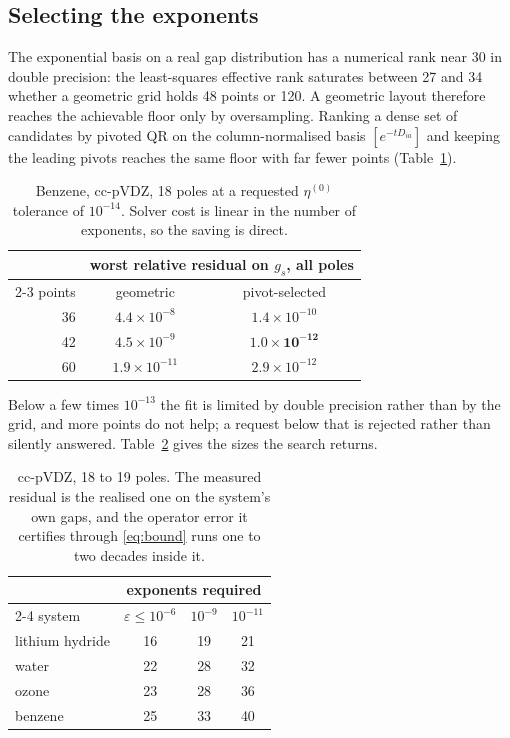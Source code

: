 \documentclass[11pt]{article}
\begin{document}
\subsection{Selecting the exponents}

The exponential basis on a real gap distribution has a numerical rank near 30 in double
precision: the least-squares effective rank saturates between 27 and 34 whether a geometric
grid holds 48 points or 120. A geometric layout therefore reaches the achievable floor only
by oversampling. Ranking a dense set of candidates by pivoted QR on the column-normalised
basis $[e^{-t D_{ia}}]$ and keeping the leading pivots reaches the same floor with far
fewer points (Table~\ref{tab:grid}).

\begin{table}[h]
\centering
\begin{tabular}{rcc}
\toprule
& \multicolumn{2}{c}{worst relative residual on $g_s$, all poles} \\
\cmidrule(l){2-3}
points & geometric & pivot-selected \\
\midrule
36 & $4.4\times10^{-8}$ & $1.4\times10^{-10}$ \\
42 & $4.5\times10^{-9}$ & $\bm{1.0\times10^{-12}}$ \\
60 & $1.9\times10^{-11}$ & $2.9\times10^{-12}$ \\
\bottomrule
\end{tabular}
\caption{Benzene, cc-pVDZ, 18 poles at a requested $\eta^{(0)}$ tolerance of $10^{-14}$.
Solver cost is linear in the number of exponents, so the saving is direct.}
\label{tab:grid}
\end{table}

Below a few times $10^{-13}$ the fit is limited by double precision rather than by the
grid, and more points do not help; a request below that is rejected rather than silently
answered. Table~\ref{tab:sizes} gives the sizes the search returns.

\begin{table}[h]
\centering
\begin{tabular}{lccc}
\toprule
& \multicolumn{3}{c}{exponents required} \\
\cmidrule(l){2-4}
system & $\varepsilon \le 10^{-6}$ & $10^{-9}$ & $10^{-11}$ \\
\midrule
lithium hydride & 16 & 19 & 21 \\
water           & 22 & 28 & 32 \\
ozone           & 23 & 28 & 36 \\
benzene         & 25 & 33 & 40 \\
\bottomrule
\end{tabular}
\caption{cc-pVDZ, 18 to 19 poles. The measured residual is the realised one on the
system's own gaps, and the operator error it certifies through \eqref{eq:bound} runs one to
two decades inside it.}
\label{tab:sizes}
\end{table}
\end{document}
